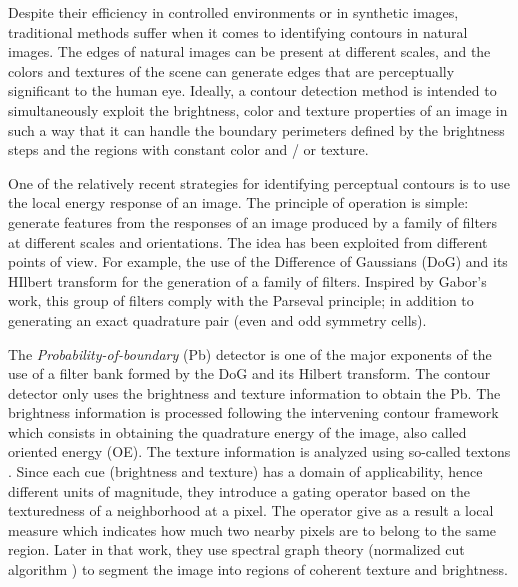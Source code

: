 Despite their efficiency in controlled environments or in synthetic images, traditional methods suffer when it comes to identifying contours in natural images. The edges of natural images can be present at different scales, and the colors and textures of the scene can generate edges that are perceptually significant to the human eye. Ideally, a contour detection method is intended to simultaneously exploit the brightness, color and texture properties of an image in such a way that it can handle the boundary perimeters defined by the brightness steps and the regions with constant color and / or texture.

One of the relatively recent strategies for identifying perceptual contours is to use the local energy response of an image. The principle of operation is simple: generate features from the responses of an image produced by a family of filters at different scales and orientations. The idea has been exploited from different points of view. For example, the use of the  Difference of Gaussians (DoG) and its HIlbert transform \citep{Morrone.Owens:PR:1987, Morrone.Burr.ea:RSL:1988} for the generation of a family of filters. Inspired by Gabor's work, this group of filters comply with the Parseval principle; in addition to generating an exact quadrature pair (even and odd symmetry cells).

The \textit{Probability-of-boundary} (Pb) detector \citep{Malik.Belongie.ea:IJCV:2001} is one of the major exponents of the use of a filter bank formed by the DoG and its Hilbert transform. The contour detector only uses the brightness and texture information to obtain the Pb. The brightness information is processed following the intervening contour framework \citep{Leung.Malik:ECCV:1998} which consists in obtaining the quadrature energy of the image, also called oriented energy (OE). The texture information is analyzed using so-called textons \citep{Malik.Belongie.ea:ICCV:1999}. Since each cue (brightness and texture) has a domain of applicability, hence different units of magnitude, they introduce a gating operator based on the texturedness of a neighborhood at a pixel. The operator give as a result a local measure which indicates how much two nearby pixels are to belong to the same region. Later in that work, they use spectral graph theory (normalized cut algorithm \citep{JianboShi.Malik:PAMI:2000}) to segment the image into regions of coherent texture and brightness.

